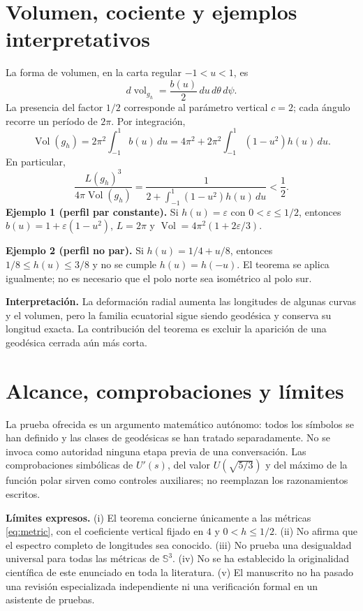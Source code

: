 \documentclass[11pt,a4paper]{article}
\theoremstyle{remark}\newtheorem{remark}[theorem]{Observación}
\newcommand{\Sthree}{\mathbb S^3}
\newcommand{\Vol}{\operatorname{Vol}}
\begin{document}
\section{Volumen, cociente y ejemplos interpretativos}
La forma de volumen, en la carta regular $-1<u<1$, es
\[
d\operatorname{vol}_{g_h}=\frac{b(u)}{2}\,du\,d\theta\,d\psi.
\]
La presencia del factor $1/2$ corresponde al parámetro vertical $c=2$; cada ángulo recorre un período de $2\pi$. Por integración,
\begin{equation}\label{eq:volume}
\boxed{\Vol(g_h)=2\pi^2\int_{-1}^{1}b(u)\,du
=4\pi^2+2\pi^2\int_{-1}^{1}(1-u^2)h(u)\,du.}
\end{equation}
En particular,
\begin{equation}\label{eq:ratio}
\boxed{\frac{L(g_h)^3}{4\pi\Vol(g_h)}
=\frac{1}{2+\int_{-1}^{1}(1-u^2)h(u)\,du}<\frac12.}
\end{equation}
\textbf{Ejemplo 1 (perfil par constante).} Si $h(u)=\varepsilon$ con $0<\varepsilon\le1/2$, entonces $b(u)=1+\varepsilon(1-u^2)$, $L=2\pi$ y $\Vol=4\pi^2(1+2\varepsilon/3)$.

\textbf{Ejemplo 2 (perfil no par).} Si $h(u)=1/4+u/8$, entonces $1/8\le h(u)\le3/8$ y no se cumple $h(u)=h(-u)$. El teorema se aplica igualmente; no es necesario que el polo norte sea isométrico al polo sur.

\textbf{Interpretación.} La deformación radial aumenta las longitudes de algunas curvas y el volumen, pero la familia ecuatorial sigue siendo geodésica y conserva su longitud exacta. La contribución del teorema es excluir la aparición de una geodésica cerrada aún más corta.

\section{Alcance, comprobaciones y límites}
La prueba ofrecida es un argumento matemático autónomo: todos los símbolos se han definido y las clases de geodésicas se han tratado separadamente. No se invoca como autoridad ninguna etapa previa de una conversación. Las comprobaciones simbólicas de $U'(s)$, del valor $U(\sqrt{5/3})$ y del máximo de la función polar sirven como controles auxiliares; no reemplazan los razonamientos escritos.

\textbf{Límites expresos.} (i) El teorema concierne únicamente a las métricas \eqref{eq:metric}, con el coeficiente vertical fijado en $4$ y $0<h\le1/2$. (ii) No afirma que el espectro completo de longitudes sea conocido. (iii) No prueba una desigualdad universal para todas las métricas de $\Sthree$. (iv) No se ha establecido la originalidad científica de este enunciado en toda la literatura. (v) El manuscrito no ha pasado una revisión especializada independiente ni una verificación formal en un asistente de pruebas.
\end{document}
